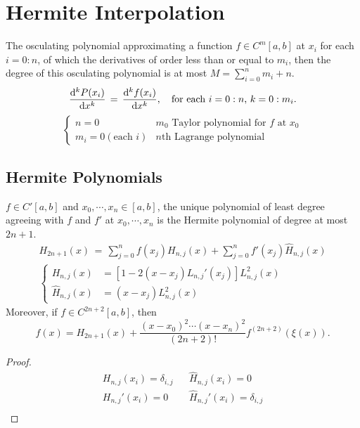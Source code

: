 \section{Hermite Interpolation}
The osculating polynomial approximating a function $f\in C^m[a,b]$ at $x_i$ for each $i=0:n$, of which the derivatives of order less than or equal to $m_i$, then the degree of this osculating polynomial is at most $M=\sum_{i=0}^{n}m_i+n$.
\[
\frac{\mathrm{d}{}^kP(x_i)}{\mathrm{d}{}x^k}\,=\,\frac{\mathrm{d}{}^kf(x_i)}{\mathrm{d}{}x^k},\quad\text{for each $i=0:n$, $k=0:m_i$}.
\]
\begin{equation*}
    \begin{cases}
    n=0 & \text{$m_0$ Taylor polynomial for $f$ at $x_0$} \\
    m_i=0(\text{each $i$}) & \text{$n$th Lagrange polynomial}
    \end{cases}
\end{equation*}

\subsection{Hermite Polynomials}
\begin{theo}
$f\in C'[a,b]$ and $x_0,\cdots,x_n\in [a,b]$, the unique polynomial of least degree agreeing with $f$ and $f'$ at $x_0,\cdots,x_n$ is the Hermite polynomial of degree at most $2n+1$.
\begin{align*}
    H_{2n+1}(x)\,=\,\sum_{j=0}^nf(x_j)H_{n,j}(x) + \sum_{j=0}^nf'(x_j)\hat{H}_{n,j}(x) \\
    \begin{cases}
    H_{n,j}(x) &= \left[1-2(x-x_j)L_{n,j}'(x_j)\right]L_{n,j}^2(x) \\
    \hat{H}_{n,j}(x) &= (x-x_j)L_{n,j}^2(x)
    \end{cases}
\end{align*}
Moreover, if $f\in C^{2n+2}[a,b]$, then
\[
f(x)=H_{2n+1}(x)+\frac{(x-x_0)^2\cdots(x-x_n)^2}{(2n+2)!}f^{(2n+2)}\left(\xi(x)\right).
\]
\end{theo}
\begin{proof}
\begin{align*}
    & H_{n,j}(x_i)=\delta_{i,j} & & \hat{H}_{n,j}(x_i)=0 & \\
    & H_{n,j}'(x_i)=0 & & \hat{H}_{n,j}'(x_i)=\delta_{i,j} & \\
\end{align*}
\end{proof}

